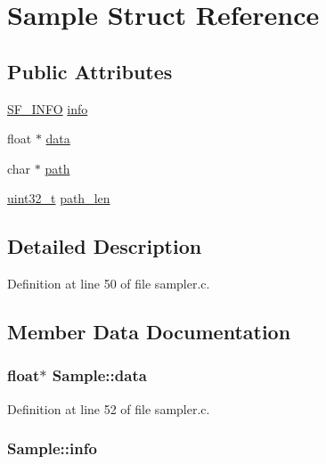 \hypertarget{struct_sample}{}\section{Sample Struct Reference}
\label{struct_sample}
\subsection*{Public Attributes}
\begin{DoxyCompactItemize}
\item 
\hyperlink{struct_s_f___i_n_f_o}{S\+F\+\_\+\+I\+N\+FO} \hyperlink{struct_sample_a1b171f6bc62849d44d778a3846606a2c}{info}
\item 
float $\ast$ \hyperlink{struct_sample_a8750416c5ff8b3528933f3d301efb0c0}{data}
\item 
char $\ast$ \hyperlink{struct_sample_aa4d619cb7a01ae619375eddd139b924a}{path}
\item 
\hyperlink{lib-src_2ffmpeg_2win32_2stdint_8h_a6eb1e68cc391dd753bc8ce896dbb8315}{uint32\+\_\+t} \hyperlink{struct_sample_a667e56ed4c7c1505a58b7d5c5b140e76}{path\+\_\+len}
\end{DoxyCompactItemize}


\subsection{Detailed Description}


Definition at line 50 of file sampler.\+c.



\subsection{Member Data Documentation}
\subsubsection[{\texorpdfstring{data}{data}}]{\setlength{\rightskip}{0pt plus 5cm}float$\ast$ Sample\+::data}\hypertarget{struct_sample_a8750416c5ff8b3528933f3d301efb0c0}{}\label{struct_sample_a8750416c5ff8b3528933f3d301efb0c0}


Definition at line 52 of file sampler.\+c.

\subsubsection[{\texorpdfstring{info}{info}}]{ Sample\+::info}\hypertarget{struct_sample_a1b171f6bc62849d44d778a3846606a2c}{}\label{struct_sample_a1b171f6bc62849d44d778a3846606a2c}


